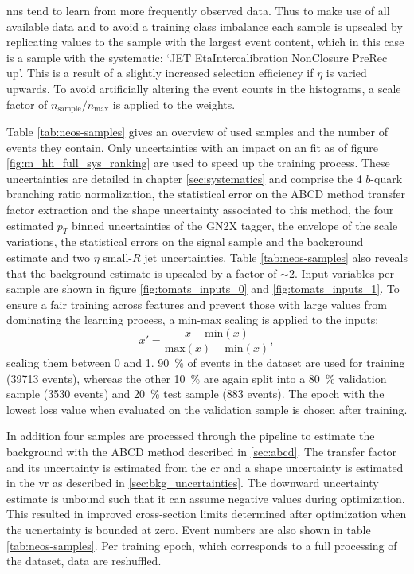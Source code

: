 \acp{nn} tend to learn from more frequently observed data. Thus to make use of all available data and to avoid a training class imbalance each sample is upscaled by replicating values to the sample with the largest event content, which in this case is a sample with the systematic: `JET EtaIntercalibration NonClosure PreRec up'. This is a result of a slightly increased selection efficiency if $\eta$ is varied upwards. To avoid artificially altering the event counts in the histograms, a scale factor of $n_\text{sample}/n_\text{max}$ is applied to the weights.

Table \ref{tab:neos-samples} gives an overview of used samples and the number of events they contain. Only uncertainties with an impact on an \mhh{} fit as of figure \ref{fig:m_hh_full_sys_ranking} are used to speed up the training process. These uncertainties are detailed in chapter \ref{sec:systematics} and comprise the 4 $b$-quark branching ratio normalization, the statistical error on the ABCD method transfer factor extraction and the shape uncertainty associated to this method, the four estimated $p_T$ binned uncertainties of the GN2X tagger, the envelope of the scale variations, the statistical errors on the \ktwov signal sample and the background estimate and two $\eta$ small-$R$ jet uncertainties. Table \ref{tab:neos-samples} also reveals that the background estimate is upscaled by a factor of $\sim 2$. Input variables per sample are shown in figure \ref{fig:tomats_inputs_0} and \ref{fig:tomats_inputs_1}. To ensure a fair training across features and prevent those with large values from dominating the learning process, a min-max scaling is applied to the inputs:
\begin{equation}
    x'=\frac{x - \text{min}(x)}{\text{max}(x)-\text{min}(x)},
\end{equation}
scaling them between 0 and 1. \qty[]{90}{\percent} of events in the dataset are used for training (39713 events), whereas the other \qty[]{10}{\percent} are again split into a \qty[]{80}{\percent} validation sample (3530 events) and \qty[]{20}{\percent} test sample (883 events). The epoch with the lowest loss value when evaluated on the validation sample is chosen after training. 

In addition four samples are processed through the pipeline to estimate the background with the ABCD method described in \ref{sec:abcd}. The transfer factor and its uncertainty is estimated from the \ac{cr} and a shape uncertainty is estimated in the \ac{vr} as described in \ref{sec:bkg_uncertainties}. The downward uncertainty estimate is unbound such that it can assume negative values during optimization. This resulted in improved cross-section limits determined after optimization when the ucnertainty is bounded at zero.  Event numbers are also shown in table \ref{tab:neos-samples}. Per training epoch, which corresponds to a full processing of the dataset, data are reshuffled.

